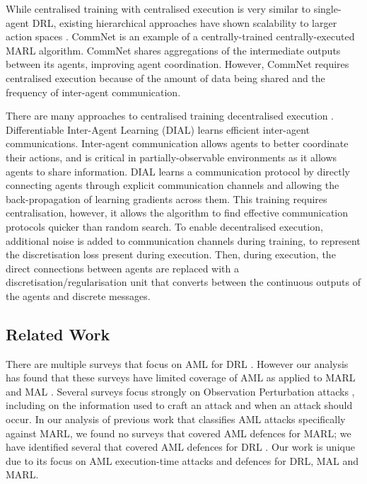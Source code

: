\documentclass[conference,compsoc]{IEEEtran}
\begin{document}
While centralised training with centralised execution is very similar to single-agent DRL, existing hierarchical approaches have shown scalability to larger action spaces \cite{liu_discrete-valued_2021, sukhbaatar_learning_2016}. CommNet \cite{sukhbaatar_learning_2016} is an example of a centrally-trained centrally-executed MARL algorithm. CommNet shares aggregations of the intermediate outputs between its agents, improving agent coordination. However, CommNet requires centralised execution because of the amount of data being shared and the frequency of inter-agent communication. 

There are many approaches to centralised training decentralised execution \cite{blumenkamp_emergence_2021,das_tarmac_2019,foerster_learning_2016-1,foerster_counterfactual_2018,gupta_cooperative_2017,iqbal_actor-attention-critic_2019,lowe_multi-agent_2017,singh_learning_2018}. Differentiable Inter-Agent Learning (DIAL) \cite{foerster_learning_2016-1} learns efficient inter-agent communications. Inter-agent communication allows agents to better coordinate their actions, and is  critical in partially-observable environments as it allows agents to share information. DIAL learns a communication protocol by directly connecting agents through explicit communication channels and allowing the back-propagation of learning gradients across them.  This training requires centralisation, however, it allows the algorithm to find effective communication protocols quicker than random search. To enable decentralised execution, additional noise is added to  communication channels during  training, to represent the discretisation loss present during execution. Then, during execution, the direct connections between agents are replaced with a discretisation/regularisation unit that converts between the continuous outputs of the agents and discrete messages.





\subsection{Related Work}
There are multiple surveys that focus on AML for DRL \cite{ilahi_challenges_2021, bai_recent_2021, chen_adversarial_2019, ren_adversarial_2020}. However our analysis has found that these surveys have limited coverage of AML as applied to MARL and MAL \cite{ilahi_challenges_2021}. Several surveys focus strongly  on Observation Perturbation attacks   \cite{ilahi_challenges_2021, chen_adversarial_2019, ren_adversarial_2020}, including on the information used to craft an attack and when an attack should occur. In our analysis of  previous work that classifies AML attacks  \cite{ilahi_challenges_2021, bai_recent_2021} specifically against MARL, we found no surveys that covered AML defences for MARL; we have identified several that covered AML defences for DRL \cite{ilahi_challenges_2021, chen_adversarial_2019, bai_recent_2021, ren_adversarial_2020}. Our work is unique due to its focus on AML execution-time attacks and defences for DRL, MAL and MARL.
\end{document}
